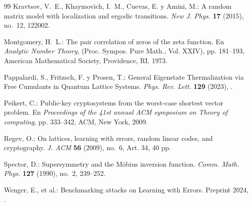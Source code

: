 \documentclass{article}
\numberwithin{equation}{section}
\theoremstyle{plain}
\theoremstyle{definition}
\begin{document}
\begin{thebibliography}{99}
Kravtsov, V.~E., Khaymovich, I.~M., Cuevas, E. y Amini, M.: 
A random matrix model with localization and ergodic transitions.
\emph{New J. Phys.} \textbf{17} (2015), no.~12, 122002.

Montgomery, H.~L.: 
The pair correlation of zeros of the zeta function.
En \emph{Analytic Number Theory}, (Proc. Sympos. Pure Math., Vol. XXIV), 
pp. 181--193, American Mathematical Society, Providence, RI, 1973.

Pappalardi, S., Fritzsch, F. y Prosen, T.:
General Eigenstate Thermalization via Free Cumulants in Quantum Lattice Systems.
\emph{Phys. Rev. Lett.} \textbf{129} (2023), .

Peikert, C.: 
Public-key cryptosystems from the worst-case shortest vector problem.
En \emph{Proceedings of the 41st annual ACM symposium on Theory of computing}, 
pp. 333--342, ACM, New York, 2009.

Regev, O.: 
On lattices, learning with errors, random linear codes, and cryptography.
\emph{J. ACM} \textbf{56} (2009), no.~6, Art. 34, 40 pp.

Spector, D.: 
Supersymmetry and the M\"{o}bius inversion function. 
\emph{Comm. Math. Phys.} \textbf{127} (1990), no.~2, 239--252.

Wenger, E., et al.: 
Benchmarking attacks on Learning with Errors. 
Preprint 2024, .

\end{thebibliography}
\end{document}
